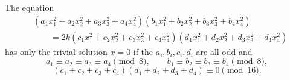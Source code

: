\begin{proposition}\label{eq:121}
    The equation
\[
    \begin{aligned}&(a_1x_1^2+a_2x_2^2+a_3x_3^2+a_4x_4^2)(b_1x_1^2+b_2x_2^2+b_3x_3^2+b_4x_4^2)\\&\qquad=2k(c_1x_1^2+c_2x_2^2+c_3x_3^2+c_4x_4^2)(d_1x_1^2+d_2x_2^2+d_3x_3^2+d_4x_4^2)\end{aligned}
\]
    has only the trivial solution $x=0$ if the $a_i,b_i,c_i,d_i$ are all odd and
\[
    a_1\equiv a_2\equiv a_3\equiv a_4\pmod8,\qquad b_1\equiv b_2\equiv b_3\equiv b_4\pmod8,
\]
\[
    (c_1+c_2+c_3+c_4)(d_1+d_2+d_3+d_4)\equiv0\pmod{16}.
\]
\end{proposition}

